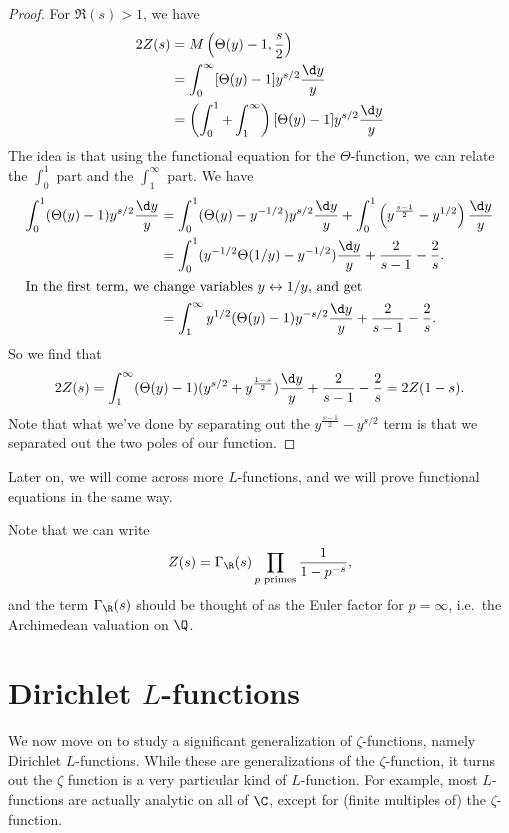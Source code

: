 \documentclass[a4paper]{article}
\begin{document}
\begin{proof}
  For $\Re(s) > 1$, we have
  \begin{align*}
    2Z(s) &= M\left(\Theta(y) - 1, \frac{s}{2}\right) \\
    &= \int_0^\infty [\Theta(y) - 1] y^{s/2} \frac{\d y}{y}\\
    &= \left(\int_0^1 + \int_1^\infty\right)[\Theta(y) - 1] y^{s/2} \frac{\d y}{y}
  \end{align*}
  The idea is that using the functional equation for the $\Theta$-function, we can relate the $\int_0^1$ part and the $\int_1^\infty$ part. We have
  \begin{align*}
    \int_0^1 (\Theta(y) - 1) y^{s/2} \frac{\d y}{y} &= \int_0^1 (\Theta(y) - y^{-1/2}) y^{s/2} \frac{\d y}{y} + \int_0^1 \left(y^{\frac{s - 1}{2}} - y^{1/2}\right) \frac{\d y}{y}\\
    &= \int_0^1 (y^{-1/2} \Theta(1/y) - y^{-1/2}) \frac{\d y}{y} + \frac{2}{s - 1} - \frac{2}{s}.\\
    \intertext{In the first term, we change variables $y \leftrightarrow 1/y$, and get}
    &= \int_1^\infty y^{1/2} (\Theta(y) - 1) y^{-s/2} \frac{\d y}{y} + \frac{2}{s - 1} - \frac{2}{s}.
  \end{align*}
  So we find that
  \[
    2Z(s) = \int_1^\infty (\Theta(y) - 1)(y^{s/2} + y^{\frac{1 - s}{2}}) \frac{\d y}{y} + \frac{2}{s - 1} - \frac{2}{s} = 2Z(1 - s).
  \]
  Note that what we've done by separating out the $y^{\frac{s - 1}{2}} - y^{s/2}$ term is that we separated out the two poles of our function.
\end{proof}
Later on, we will come across more $L$-functions, and we will prove functional equations in the same way.

Note that we can write
\[
  Z(s) = \Gamma_\R(s) \prod_{p\text{ primes}} \frac{1}{1 - p^{-s}},
\]
and the term $\Gamma_\R(s)$ should be thought of as the Euler factor for $p = \infty$, i.e.\ the Archimedean valuation on $\Q$.

\section{Dirichlet \texorpdfstring{$L$}{L}-functions}
We now move on to study a significant generalization of $\zeta$-functions, namely Dirichlet $L$-functions. While these are generalizations of the $\zeta$-function, it turns out the $\zeta$ function is a very particular kind of $L$-function. For example, most $L$-functions are actually analytic on all of $\C$, except for (finite multiples of) the $\zeta$-function.
\end{document}
